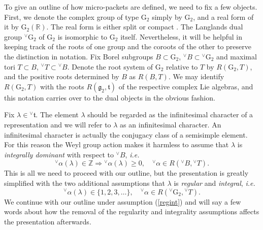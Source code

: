 \documentclass[a4paper, 11pt]{article}
\begin{document}
To give an outline of how micro-packets are defined, we need to
fix a few objects.   First, we denote the
complex group of type $\mathrm{G}_{2}$ simply by $\mathrm{G}_{2}$, and
a real form of it by
$\mathrm{G}_{2}(\mathbb{R})$.  The real form is either split or
compact \cite[Table  II]{Tits}.  
The Langlands dual group
${^\vee}\mathrm{G}_{2}$ of $\mathrm{G}_{2}$ is isomorphic to
$\mathrm{G}_{2}$ itself.  Nevertheless, it will be helpful in keeping
track of the roots of one group and the coroots of the other to
preserve the distinction in notation.  Fix  Borel subgroups $B
\subset \mathrm{G}_{2}$, ${^\vee}B \subset {^\vee}\mathrm{G}_{2}$ and
maximal tori  $T \subset B$, ${^\vee}T \subset {^\vee}B$.  Denote
the root system of $\mathrm{G}_{2}$ relative to $T$ by
$R(\mathrm{G}_{2},T)$, and the positive 
roots determined by $B$ as $R(B,T)$.  We may identify
$R(\mathrm{G}_{2},T)$ with the roots $R(\mathfrak{g}_{2},
\mathfrak{t})$ of the respective complex Lie algebras, and this
notation carries over to the dual objects in the obvious fashion.  

Fix $\lambda \in {^\vee}\mathfrak{t}$. The element $\lambda$ should be
regarded as the infinitesimal character 
of a representation and we will refer to $\lambda$ as an infinitesimal
character.  An infinitesimal
character is  actually the conjugacy class of a semisimple element.
For this reason the
Weyl group action makes it harmless to 
assume that $\lambda$ is \emph{integrally dominant} with respect to 
${^\vee}B$, \emph{i.e.}
\begin{equation}
\label{intdom}
{^\vee}\alpha(\lambda) \in \mathbb{Z} \Longrightarrow
{^\vee}\alpha(\lambda) \geq 0,  \quad {^\vee}\alpha \in R({^\vee}B,
{^\vee}T).
\end{equation}
This is all we need to proceed with our outline, but the presentation
is greatly simplified with the two additional assumptions that
$\lambda$ is \emph{regular} and \emph{integral}, \emph{i.e.}
\begin{equation}
\label{regint}
{^\vee}\alpha(\lambda) \in \{1,2,3,\ldots\}, \quad {^\vee}\alpha
\in R({^\vee}\mathrm{G}_{2}, {^\vee}T).
\end{equation}
We continue with our outline under assumption (\ref{regint}) and will
say a few words about how the removal of the regularity and
integrality assumptions affects the presentation afterwards.
\end{document}
